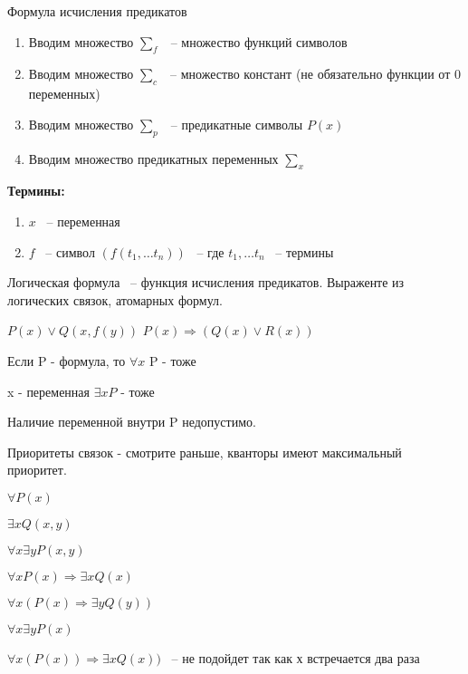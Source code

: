 \documentclass[russian]{lecture-notes}
\begin{document}
    \begin{definition}
        Формула исчисления предикатов

        \begin{enumerate}
            \item{
                Вводим множество $\sum_f$ ~-- множество функций символов
            }
            \item{
                Вводим множество $\sum_c$ ~-- множество констант (не обязательно функции от 0 переменных)
            }
            \item{
                Вводим множество $\sum_p$ ~-- предикатные символы $P(x)$
            }
            \item{
                Вводим множество предикатных переменных $\sum_x$
            }
        \end{enumerate}

        \textbf{Термины:}

        \begin{enumerate}
            \item $x$ ~-- переменная
            \item{
                $f$ ~-- символ $(f(t_1, \dots t_n))$ ~-- где $t_1, \dots t_n$ ~-- термины
            }
        \end{enumerate}
    \end{definition}


    \begin{definition}

        Логическая формула ~-- функция исчисления предикатов. Выраженте из логических связок, атомарных формул.

        \end{definition}


    $P(x) \lor Q(x,f(y))$ \qquad $P(x) \Rightarrow (Q(x) \lor R(x))$

    Если P - формула, то $\forall x$ P - тоже

    x - переменная $\exists x P$ - тоже

    Наличие переменной внутри P недопустимо.

    \begin{remark}

        Приоритеты связок - смотрите раньше, кванторы имеют максимальный приоритет.

        \end{remark}

    \begin{example}

        $\forall P(x)$

        $\exists x Q(x,y)$

        $\forall x \exists y P(x,y)$

        $\forall x P(x) \Rightarrow \exists x Q(x)$

        $\forall x (P(x) \Rightarrow \exists y Q(y))$

        $\forall x \exists y P(x)$

        $\forall x (P(x)) \Rightarrow \exists x Q(x))$ ~-- не подойдет так как х встречается два раза

        \end{example}
\end{document}
